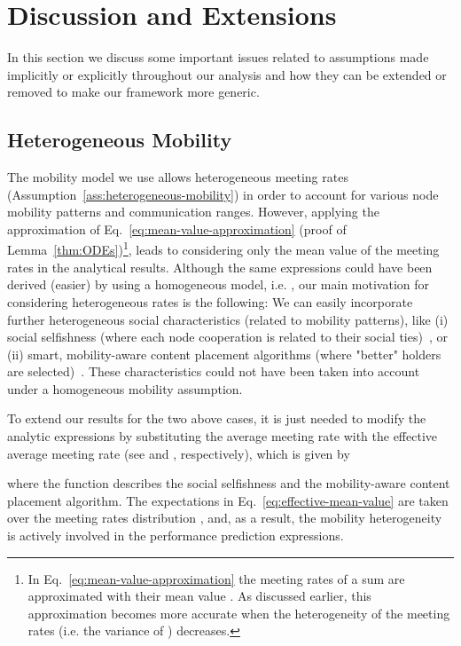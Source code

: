 \documentclass[10pt,conference,letterpaper]{IEEEtran}
\newcommand{\eq}[1]{Eq.~\eqref{#1}}
\begin{document}
\section{Discussion and Extensions}\label{sec:discussion}
In this section we discuss some important issues related to assumptions made implicitly or explicitly throughout our analysis and how they can be extended or removed to make our framework more generic.

\subsection{Heterogeneous Mobility}
The mobility model we use allows heterogeneous meeting rates  (Assumption~\ref{ass:heterogeneous-mobility}) in order to account for various node mobility patterns and communication ranges. However, applying the approximation of \eq{eq:mean-value-approximation} (proof of Lemma~\ref{thm:ODEs})\footnote{In \eq{eq:mean-value-approximation} the meeting rates of a sum are approximated with their mean value . As discussed earlier, this approximation becomes more accurate when the heterogeneity of the meeting rates (i.e. the variance of ) decreases.}, leads to considering only the mean value of the meeting rates  in the analytical results. Although the same expressions could have been derived (easier) by using a homogeneous model, i.e. , our main motivation for considering heterogeneous rates is the following: We can easily incorporate further heterogeneous social characteristics (related to mobility patterns), like (i) social selfishness (where each node cooperation is related to their social ties)~\cite{pavlos-social-selfishness}, or (ii) smart, mobility-aware content placement algorithms (where "better" holders are selected)~\cite{pavlos-not-all-content}. These characteristics could not have been taken into account under a homogeneous mobility assumption. 

To extend our results for the two above cases, it is just needed to modify the analytic expressions by substituting the average meeting rate  with the effective average meeting rate  (see \cite[Lemmas~3.1 and~3.2]{pavlos-social-selfishness} and \cite[Result~4]{pavlos-not-all-content}, respectively), which is given by

where the function  describes the social selfishness and  the mobility-aware content placement algorithm. The expectations in \eq{eq:effective-mean-value} are taken over the meeting rates distribution , and, as a result, the mobility heterogeneity is actively involved in the performance prediction expressions.
\end{document}
